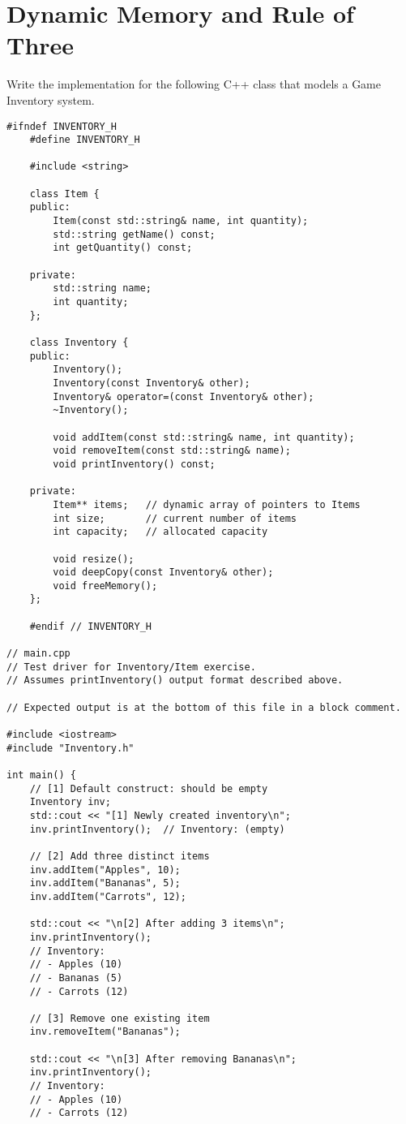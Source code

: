 \documentclass{article}
\begin{document}
\section{Dynamic Memory and Rule of Three}
Write the implementation for the following C++ class that models a Game Inventory system.
\begin{lstlisting}[style=cppstyle]
	#ifndef INVENTORY_H
	#define INVENTORY_H
	
	#include <string>
	
	class Item {
	public:
		Item(const std::string& name, int quantity);
		std::string getName() const;
		int getQuantity() const;
	
	private:
		std::string name; 
		int quantity;
	};
	
	class Inventory {
	public:
		Inventory();
		Inventory(const Inventory& other);
		Inventory& operator=(const Inventory& other);
		~Inventory();
	
		void addItem(const std::string& name, int quantity);
		void removeItem(const std::string& name);
		void printInventory() const;
	
	private:
		Item** items;   // dynamic array of pointers to Items
		int size;       // current number of items
		int capacity;   // allocated capacity
	
		void resize();
		void deepCopy(const Inventory& other);
		void freeMemory();
	};
	
	#endif // INVENTORY_H

// main.cpp
// Test driver for Inventory/Item exercise.
// Assumes printInventory() output format described above.

// Expected output is at the bottom of this file in a block comment.

#include <iostream>
#include "Inventory.h"

int main() {
    // [1] Default construct: should be empty
    Inventory inv;
    std::cout << "[1] Newly created inventory\n";
    inv.printInventory();  // Inventory: (empty)

    // [2] Add three distinct items
    inv.addItem("Apples", 10);
    inv.addItem("Bananas", 5);
    inv.addItem("Carrots", 12);

    std::cout << "\n[2] After adding 3 items\n";
    inv.printInventory();
    // Inventory:
    // - Apples (10)
    // - Bananas (5)
    // - Carrots (12)

    // [3] Remove one existing item
    inv.removeItem("Bananas");

    std::cout << "\n[3] After removing Bananas\n";
    inv.printInventory();
    // Inventory:
    // - Apples (10)
    // - Carrots (12)


\end{lstlisting}
\end{document}
